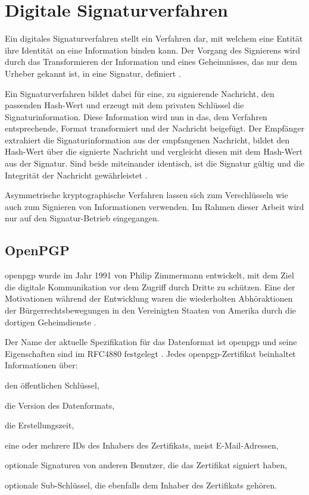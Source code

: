 \section{Digitale Signaturverfahren}
\label{sec:GrundlagenDefinitionen:DigitaleSignaturen:Verfahren}
Ein digitales Signaturverfahren stellt ein Verfahren dar, mit welchem eine Entität ihre Identität an eine Information binden kann. Der Vorgang des Signierens
wird durch das Transformieren der Information und eines Geheimnisses, das nur dem Urheber gekannt ist, in eine Signatur, definiert \cite{hac}.

Ein Signaturverfahren bildet dabei für eine, zu signierende Nachricht, den passenden Hash-Wert und erzeugt mit dem privaten Schlüssel die Signaturinformation.
Diese Information wird nun in das, dem Verfahren entsprechende, Format transformiert und der Nachricht beigefügt.
Der Empfänger extrahiert die Signaturinformation aus der empfangenen Nachricht, bildet den Hash-Wert über die signierte Nachricht und vergleicht diesen mit dem
Hash-Wert aus der Signatur. Sind beide miteinander identisch, ist die Signatur gültig und die Integrität der Nachricht gewährleistet \cite{hac,singh:messages}.

Asymmetrische kryptographische Verfahren lassen sich zum Verschlüsseln wie auch zum Signieren von Informationen verwenden. Im Rahmen dieser Arbeit wird nur auf
den Signatur-Betrieb eingegangen.

\subsection{OpenPGP}
\label{sec:GrundlagenDefinitionen:DigitaleSignaturen:Verfahren:openpgp}
\gls{openpgp} wurde im Jahr 1991 von Philip Zimmermann \cite{zimmermann:pgp,pgp,intro-crypto} entwickelt, mit dem Ziel die digitale Kommunikation vor dem Zugriff durch Dritte zu
schützen. Eine der Motivationen während der Entwicklung waren die wiederholten Abhöraktionen der Bürgerrechtsbewegungen in den Vereinigten Staaten von Amerika
durch die dortigen Geheimdienste \cite{singh:messages}.

Der Name der aktuelle Spezifikation für das Datenformat ist \gls{openpgp} und seine Eigenschaften sind im RFC4880 festgelegt \cite{openpgp:ietf}. 
Jedes \gls{openpgp}-Zertifikat beinhaltet Informationen über:
\begin{itemize*}
    \item den öffentlichen Schlüssel,
    \item die Version des Datenformats,
    \item die Erstellungszeit,
    \item eine oder mehrere IDs des Inhabers des Zertifikats, meist E-Mail-Adressen,
    \item optionale Signaturen von anderen Benutzer, die das Zertifikat signiert haben,
    \item optionale Sub-Schlüssel, die ebenfalls dem Inhaber des Zertifikats gehören.
\end{itemize*}

